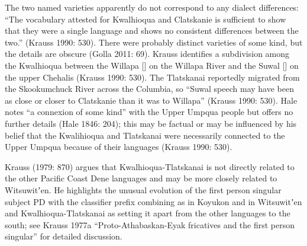 \documentclass[12pt,letterpaper,oneside,article]{memoir}
\begin{document}
The two named varieties apparently do not correspond to any dialect differences: “The vocabulary attested for Kwalhioqua and Clatskanie is sufficient to show that they were a single language and shows no consistent differences between the two.” (Krauss 1990: 530).
There were probably distinct varieties of some kind, but the details are obscure (Golla 2011: 69).
Krauss identifies a subdivision among the Kwalhioqua between the Willapa [] on the Willapa River and the Suwal [] on the upper Chehalis (Krauss 1990: 530).
The Tlatskanai reportedly migrated from the Skookumchuck River across the Columbia, so “Suwal speech may have been as close or closer to Clatskanie than it was to Willapa” (Krauss 1990: 530).
Hale notes “a connexion of some kind” with the Upper Umpqua people but offers no further details (Hale 1846: 204); this may be factual or may be influenced by his belief that the Kwalihioqua and Tlatskanai were necessarily connected to the Upper Umpqua because of their languages (Krauss 1990: 530).

Krauss (1979: 870) argues that Kwalhioqua-Tlatskanai is not directly related to the other Pacific Coast Dene languages and may be more closely related to Witsuwitʼen.
He highlights the unusual evolution of the first person singular subject PD  with the  classifier prefix combining as  in Koyukon and  in Witsuwitʼen and Kwalhioqua-Tlatskanai as setting it apart from the other languages to the south; see Krauss 1977a “Proto-Athabaskan-Eyak fricatives and the first person singular” for detailed discussion.
\end{document}
